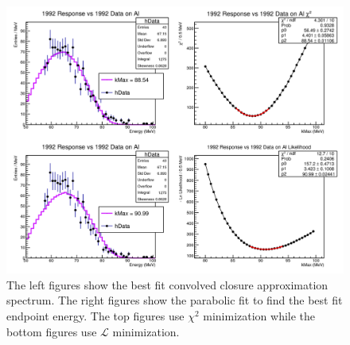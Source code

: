
\begin{figure}[h]
  \centering
  \includegraphics[width=0.8\linewidth]{figures/png/1992_resp_1992_Al_data_allPlots_singleK.png}
  \caption{The left figures show the best fit convolved closure approximation spectrum. The right figures
  show the parabolic fit to find the best fit endpoint energy. The top figures use $\chi ^2$ 
  minimization while the bottom figures use $\mathcal{L}$ minimization.}
  \label{fig:1992AlFits}
\end{figure}


